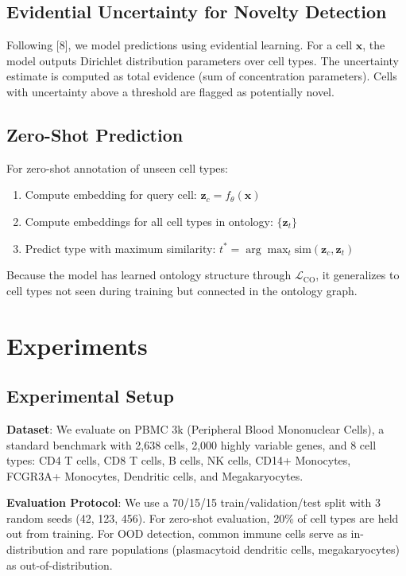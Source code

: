 \documentclass[11pt]{article}
\begin{document}
\subsection{Evidential Uncertainty for Novelty Detection}

Following [8], we model predictions using evidential learning. For a cell $\mathbf{x}$, the model outputs Dirichlet distribution parameters over cell types. The uncertainty estimate is computed as total evidence (sum of concentration parameters). Cells with uncertainty above a threshold are flagged as potentially novel.

\subsection{Zero-Shot Prediction}

For zero-shot annotation of unseen cell types:
\begin{enumerate}
    \item Compute embedding for query cell: $\mathbf{z}_c = f_\theta(\mathbf{x})$
    \item Compute embeddings for all cell types in ontology: $\{\mathbf{z}_t\}$
    \item Predict type with maximum similarity: $t^* = \arg\max_t \text{sim}(\mathbf{z}_c, \mathbf{z}_t)$
\end{enumerate}
Because the model has learned ontology structure through $\mathcal{L}_{\text{CO}}$, it generalizes to cell types not seen during training but connected in the ontology graph.

\section{Experiments}

\subsection{Experimental Setup}

\textbf{Dataset}: We evaluate on PBMC 3k (Peripheral Blood Mononuclear Cells), a standard benchmark with 2,638 cells, 2,000 highly variable genes, and 8 cell types: CD4 T cells, CD8 T cells, B cells, NK cells, CD14+ Monocytes, FCGR3A+ Monocytes, Dendritic cells, and Megakaryocytes.

\textbf{Evaluation Protocol}: We use a 70/15/15 train/validation/test split with 3 random seeds (42, 123, 456). For zero-shot evaluation, 20\% of cell types are held out from training. For OOD detection, common immune cells serve as in-distribution and rare populations (plasmacytoid dendritic cells, megakaryocytes) as out-of-distribution.
\end{document}
